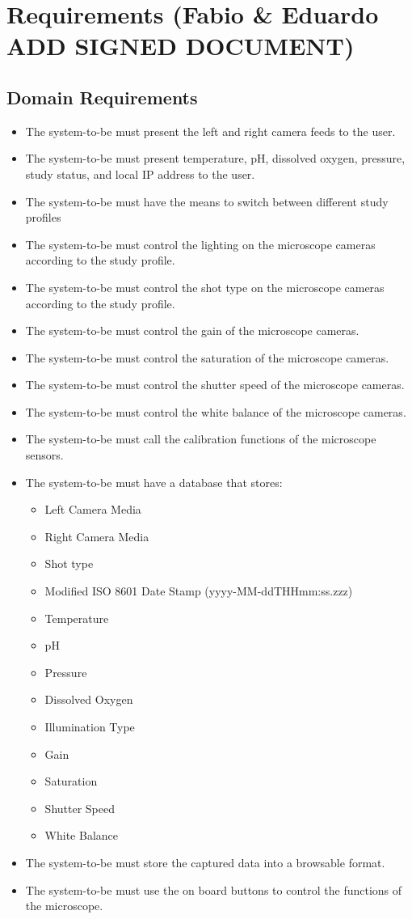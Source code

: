 \section{Requirements (Fabio \& Eduardo  ADD SIGNED DOCUMENT)}
\subsection{Domain Requirements}
\begin{itemize}
	\item The system-to-be must present the left and right camera feeds to the user.
	\item The system-to-be must present temperature, pH, dissolved oxygen, pressure, study status, and local IP address to the user.
	\item The system-to-be must have the means to switch between different study profiles
	\item The system-to-be must control the lighting on the microscope cameras according to the study profile.
	\item The system-to-be must control the shot type on the microscope cameras according to the study profile.
	\item The system-to-be must control the gain of the microscope cameras.
	\item The system-to-be must control the saturation of the microscope cameras.
	\item The system-to-be must control the shutter speed of the microscope cameras.
	\item The system-to-be must control the white balance of the microscope cameras.
	\item The system-to-be must call the calibration functions of the microscope sensors.
	\item The system-to-be must have a database that stores:
	      \begin{itemize}
		      \item Left Camera Media
		      \item Right Camera Media
		      \item Shot type
		      \item Modified ISO 8601 Date Stamp (yyyy-MM-ddTHHmm:ss.zzz)
		      \item Temperature
		      \item pH
		      \item Pressure
		      \item Dissolved Oxygen
		      \item Illumination Type
		      \item Gain
		      \item Saturation
		      \item Shutter Speed
		      \item White Balance
	      \end{itemize}
	\item The system-to-be must store the captured data into a browsable format.
	\item The system-to-be must use the on board buttons to control the functions of the microscope.
\end{itemize}
